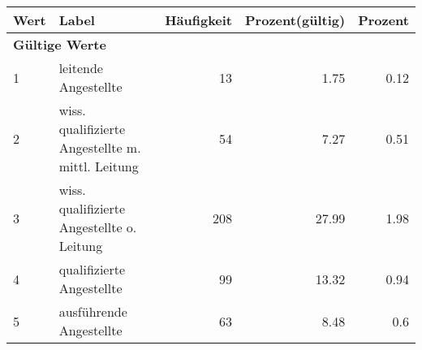      \begin{longtable}{lXrrr}
     \toprule
     \textbf{Wert} & \textbf{Label} & \textbf{Häufigkeit} & \textbf{Prozent(gültig)} & \textbf{Prozent} \\
     \endhead
     \midrule
     \multicolumn{5}{l}{\textbf{Gültige Werte}}\\

     1 &
     \multicolumn{1}{X}{ leitende Angestellte   } &


       \num{13} &
       \num[round-mode=places,round-precision=2]{1.75} &
         \num[round-mode=places,round-precision=2]{0.12} \\

     2 &
     \multicolumn{1}{X}{ wiss. qualifizierte Angestellte m. mittl. Leitung   } &


       \num{54} &
       \num[round-mode=places,round-precision=2]{7.27} &
         \num[round-mode=places,round-precision=2]{0.51} \\

     3 &
     \multicolumn{1}{X}{ wiss. qualifizierte Angestellte o. Leitung   } &


       \num{208} &
       \num[round-mode=places,round-precision=2]{27.99} &
         \num[round-mode=places,round-precision=2]{1.98} \\

     4 &
     \multicolumn{1}{X}{ qualifizierte Angestellte   } &


       \num{99} &
       \num[round-mode=places,round-precision=2]{13.32} &
         \num[round-mode=places,round-precision=2]{0.94} \\

     5 &
     \multicolumn{1}{X}{ ausführende Angestellte   } &


       \num{63} &
       \num[round-mode=places,round-precision=2]{8.48} &
         \num[round-mode=places,round-precision=2]{0.6} \\


\end{longtable}
